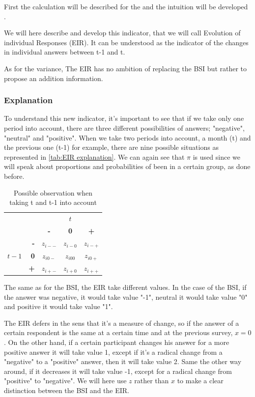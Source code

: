 \documentclass[12pt,a4paper,oneside]{book}
\begin{document}
First the calculation will be described for the and the intuition will be developed .


We will here describe and develop this indicator, that we will call Evolution of individual Responses (EIR).
It can be understood as the indicator of the changes in individual answers between t-1 and t.

As for the variance, The EIR has no ambition of replacing the BSI but rather to propose an addition information.

\subsubsection{Explanation}

To understand this new indicator, it's important to see that if we take only one period into account, there are three different possibilities of answers; "negative", "neutral" and "positive". 
When we take two periods into account, a month (t) and the previous one (t-1) for example, there are nine possible situations as represented in \autoref{tab:EIR explanation}. 
We can again see that $\pi$ is used since we will speak about proportions and probabilities of been in a certain group, as done before.

\begin{table}[H]
    \centering
    \begin{tabular}{r | r | c c c | }
    \multicolumn{1}{r}{} & \multicolumn{1}{r}{} &	\multicolumn{3}{c}{$t$} \\ \cline{3-5}
    \multicolumn{1}{r}{} & 		& \textbf{-} & \textbf{0} & \textbf{+} \\ \cline{2-5}
    		&    \textbf{-} & $z_{i--}$	& $z_{i-0}$	& $z_{i-+}$ \\ 
    $t-1$ & \textbf{0} & $z_{i0-}$	& $z_{i00}$	& $z_{i0+}$	\\
    		&    \textbf{+} & $z_{i+-}$	& $z_{i+0}$	& $z_{i++}$ \\ \cline{2-5}
    \end{tabular}
    \caption{Possible observation when taking t and t-1 into account}
    \label{tab:EIR explanation}
\end{table}{}

The same as for the BSI, the EIR take different values. In the case of the BSI, if the answer was negative, it would take value "-1", neutral it would take value "0" and positive it would take value "1".

The EIR defers in the sens that it's a measure of change, so if the answer of a certain respondent is the same at a certain time and at the previous survey, $x=0$. 
On the other hand, if a certain participant changes his answer for a more positive answer it will take value 1, except if it's a radical change from a "negative" to a "positive" answer, then it will take value 2.
Same the other way around, if it decreases it will take value -1, except for a radical change from "positive" to "negative".
We will here use $z$ rather than $x$ to make a clear distinction between the BSI and the EIR.
\end{document}
